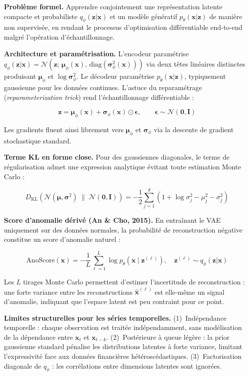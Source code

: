 \documentclass[12pt,a4paper]{article}
\begin{document}
\textbf{Problème formel.} Apprendre conjointement une représentation latente compacte et probabiliste $q_\phi(\mathbf{z}|\mathbf{x})$ et un modèle génératif $p_\theta(\mathbf{x}|\mathbf{z})$ de manière non supervisée, en rendant le processus d'optimisation différentiable end-to-end malgré l'opération d'échantillonnage.

\textbf{Architecture et paramétrisation.} L'encodeur paramétrise $q_\phi(\mathbf{z}|\mathbf{x}) = \mathcal{N}(\mathbf{z};\,\boldsymbol{\mu}_\phi(\mathbf{x}),\,\mathrm{diag}(\boldsymbol{\sigma}^2_\phi(\mathbf{x})))$ via deux têtes linéaires distinctes produisant $\boldsymbol{\mu}_\phi$ et $\log\boldsymbol{\sigma}^2_\phi$. Le décodeur paramétrise $p_\theta(\mathbf{x}|\mathbf{z})$, typiquement gaussienne pour les données continues. L'astuce du reparamétrage (\textit{reparameterization trick}) rend l'échantillonnage différentiable :

$$\mathbf{z} = \boldsymbol{\mu}_\phi(\mathbf{x}) + \boldsymbol{\sigma}_\phi(\mathbf{x}) \odot \boldsymbol{\epsilon}, \qquad \boldsymbol{\epsilon} \sim \mathcal{N}(\mathbf{0}, \mathbf{I})$$

Les gradients fluent ainsi librement vers $\boldsymbol{\mu}_\phi$ et $\boldsymbol{\sigma}_\phi$ via la descente de gradient stochastique standard.

\textbf{Terme KL en forme close.} Pour des gaussiennes diagonales, le terme de régularisation admet une expression analytique évitant toute estimation Monte Carlo :

$$D_{\mathrm{KL}}\!\left(\mathcal{N}(\boldsymbol{\mu},\boldsymbol{\sigma}^2) \;\|\; \mathcal{N}(\mathbf{0},\mathbf{I})\right) = -\frac{1}{2}\sum_{j=1}^{d}\left(1 + \log\sigma_j^2 - \mu_j^2 - \sigma_j^2\right)$$

\textbf{Score d'anomalie dérivé (An \& Cho, 2015).} En entraînant le VAE uniquement sur des données normales, la probabilité de reconstruction négative constitue un score d'anomalie naturel :

$$\mathrm{AnoScore}(\mathbf{x}) = -\frac{1}{L}\sum_{\ell=1}^{L}\log p_\theta\!\left(\mathbf{x}\mid\mathbf{z}^{(\ell)}\right), \quad \mathbf{z}^{(\ell)} \sim q_\phi(\mathbf{z}|\mathbf{x})$$

Les $L$ tirages Monte Carlo permettent d'estimer l'incertitude de reconstruction : une forte variance entre les reconstructions $\hat{\mathbf{x}}^{(\ell)}$ est elle-même un signal d'anomalie, indiquant que l'espace latent est peu contraint pour ce point.

\textbf{Limites structurelles pour les séries temporelles.} (1)~Indépendance temporelle : chaque observation est traitée indépendamment, sans modélisation de la dépendance entre $\mathbf{x}_t$ et $\mathbf{x}_{t-k}$. (2)~Postérieure à queue légère : la prior gaussienne standard pénalise les distributions latentes à forte variance, limitant l'expressivité face aux données financières hétéroscédastiques. (3)~Factorisation diagonale de $q_\phi$ : les corrélations entre dimensions latentes sont ignorées.
\end{document}
